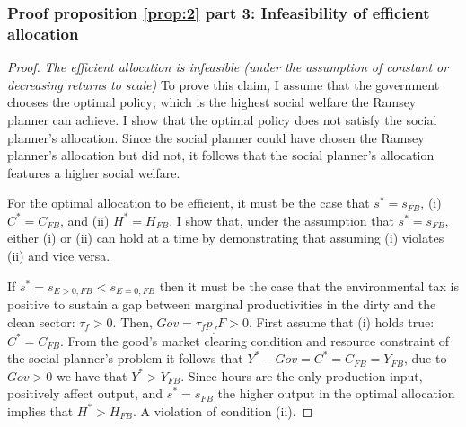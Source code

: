 \subsubsection{Proof proposition \ref{prop:2} part 3: Infeasibility of efficient allocation}
\begin{proof}\textit{The efficient allocation is infeasible (under the assumption of constant or decreasing returns to scale)}
	To prove this claim, I assume that the government chooses the optimal policy; which is the highest social welfare the Ramsey planner can achieve. I show that the optimal policy does not satisfy the social planner's allocation. Since the social planner could have chosen the Ramsey planner's allocation  but did not, it follows that the social planner's allocation features a higher social welfare.
	
	For the optimal allocation to be efficient, it must be the case that $s^*=s_{FB}$, (i) $C^*=C_{FB}$, and (ii) $H^*=H_{FB}$. I show that, under the assumption that $s^*=s_{FB}$, either (i) or (ii) can hold at a time by demonstrating that assuming (i) violates (ii) and vice versa.
	
	
	
	
	If $s^*=s_{E>0,FB}<s_{E=0,FB}$ then it must be the case that the environmental tax is positive to sustain a gap between marginal productivities in the dirty and the clean sector: $\tau_f>0$. Then, $Gov=\tau_fp_fF>0$. 
	First assume that (i) holds true: $C^*=C_{FB}$. From the good's market clearing condition and resource constraint of the social planner's problem it follows that
	$Y^*-Gov=C^*=C_{FB}=Y_{FB}$, due to  $Gov>0$ we have that $Y^*>Y_{FB}$. Since hours are the only production input, positively affect output, and $s^*=s_{FB}$ the higher output in the optimal allocation implies that $H^*>H_{FB}$. A violation of condition (ii). 
	

\end{proof}
